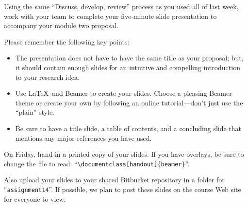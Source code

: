 
\usepackage{ulem}
\usepackage{tikz}
\usepackage[compact]{titlesec}




Using the same ``Discuss, develop, review'' process as you used all of last week, work with your team to complete your
five-minute slide presentation to accompany your module two proposal.

Please remember the following key points:
\begin{itemize}

  \item The presentation does not have to have the same title as your proposal; but, it should contain enough slides for
    an intuitive and compelling introduction to your research idea.

\item
Use \LaTeX\ and Beamer to create your slides. Choose a pleasing Beamer
theme or create your own by following an online tutorial---don't just use the ``plain'' style.
\item
Be sure to have a title slide, a table of contents, and a
concluding slide that mentions any major references you have used.
\end{itemize}

On Friday, hand in a printed copy of your slides. If you have overlays, be sure to change the file to read:
``\verb$\documentclass[handout]{beamer}$''.


Also upload your slides to your shared Bitbucket repository in a folder for ``{\tt assignment14}''. If possible, we plan
to post these slides on the course Web site for everyone to view.


